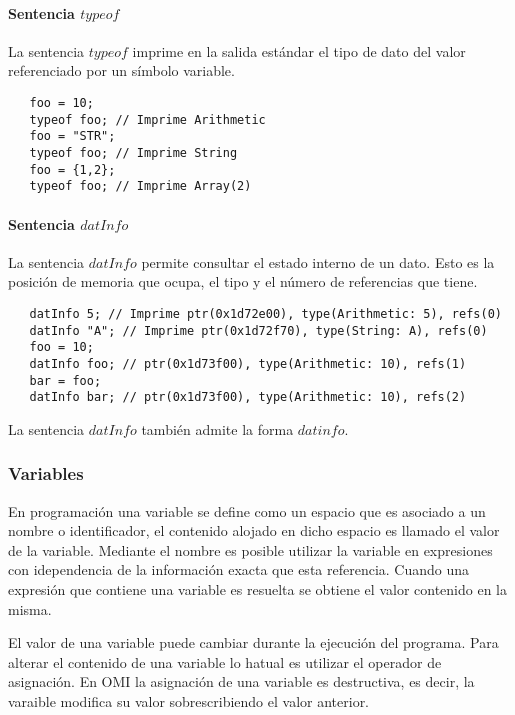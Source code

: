 \paragraph{Sentencia $typeof$} \label{sec:stmt_typeof}
La sentencia $typeof$ imprime en la salida estándar el tipo de dato del valor 
referenciado por un símbolo variable. \\

\begin{lstlisting}
   foo = 10;
   typeof foo; // Imprime Arithmetic
   foo = "STR";
   typeof foo; // Imprime String
   foo = {1,2};
   typeof foo; // Imprime Array(2)
\end{lstlisting}


\paragraph{Sentencia $datInfo$} \label{sec:stmt_datInfo}
La sentencia $datInfo$ permite consultar el estado interno de un dato. Esto
es la posición de memoria que ocupa, el tipo y el número de referencias que tiene. \\

\begin{lstlisting}
   datInfo 5; // Imprime ptr(0x1d72e00), type(Arithmetic: 5), refs(0)
   datInfo "A"; // Imprime ptr(0x1d72f70), type(String: A), refs(0)
   foo = 10;
   datInfo foo; // ptr(0x1d73f00), type(Arithmetic: 10), refs(1)
   bar = foo;
   datInfo bar; // ptr(0x1d73f00), type(Arithmetic: 10), refs(2)
\end{lstlisting}

La sentencia $datInfo$ también admite la forma $datinfo$.

\subsubsection{Variables}
En programación una variable se define como un espacio que es asociado a un nombre o identificador, el contenido alojado en dicho espacio es llamado el valor de la variable.
Mediante el nombre es posible utilizar la variable en expresiones con idependencia de la información exacta que esta referencia. Cuando una expresión que contiene una variable es resuelta
se obtiene el valor contenido en la misma. 

El valor de una variable puede cambiar durante la ejecución del programa. Para alterar el contenido de una variable lo hatual es utilizar el operador de asignación. 
En OMI la asignación de una variable es destructiva, es decir, la varaible modifica su valor sobrescribiendo el valor anterior. 

